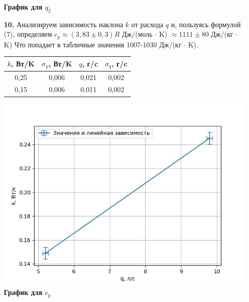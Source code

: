 \documentclass[a4paper, 12pt]{article}%
\begin{document}
\begin{enumerate}
\begin{center}
    \textbf{График для $q_2$}
  \end{center}
\item [\textbf{10.}] Анализируем зависимость наклона $k$ от расхода $q$ и, пользуясь формулой (7), определяем $c_p \approx (3,83 \pm 0,3)R$ Дж/(моль $\cdot$ K) $\approx 1111 \pm 80$ Дж/(кг $\cdot$ K)
Что попадает в табличные значения 1007-1030 Дж/(кг $\cdot$ K).
\newline
\begin{center}
\begin{tabular}{|c|c|c|c|}
\hline
$k$, Вт/K & $\sigma_k$, Вт/K & $q$, г/c & $\sigma_q$, г/c \\ \hline
0,25 & 0,006 & 0,021 & 0,002 \\ \hline
0,15 & 0,006 & 0,011 & 0,002 \\ \hline
\end{tabular}
\end{center}

\begin{center}
    \includegraphics[width = \textwidth]{211_6.jpg}
      \textbf{График для $c_p$}
  \end{center}
\end{enumerate}
\end{document}
